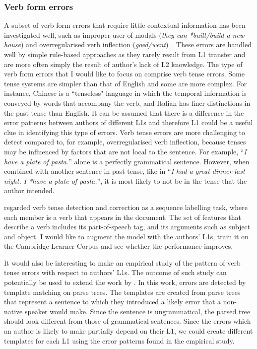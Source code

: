 \documentclass[11pt]{article}
\begin{document}
\subsubsection{Verb form errors}
\label{subsub:verb}
A subset of verb form errors that require little contextual information has been 
investigated well, such as improper user of modals (\emph{they can *built/build 
a new house}) and overregularised verb inflection 
({\em *goed/went})~\citep{chodorow2000unsupervised, leacock2003automated}. These 
errors are handled well by simple rule-based approaches as they rarely 
result from L1 transfer and are more often simply the result of author's lack of L2 knowledge. The type of verb 
form errors that I would like to focus on comprise verb tense errors. Some tense 
systems are simpler than that of English and some are more complex. For 
instance, Chinese is a ``tenseless" language in which the temporal information is 
conveyed by words that accompany the verb, and Italian has finer distinctions in 
the past tense than English. It can be assumed that there is a difference in the 
error patterns between authors of different L1s and therefore L1 could be a useful 
clue in identifying this type of errors. Verb tense errors are more challenging 
to detect compared to, for example, overregularised verb inflection, because 
tenses may be influenced by factors that are not local to the sentence. For 
example, ``{\em I have a plate of pasta.}'' alone is a perfectly grammatical sentence. 
However, when combined with another sentence in past tense, like in ``{\em I had a 
great dinner last night. I *have a plate of pasta.}'', it is most likely to not be in 
the tense that the author intended.

\cite{tajiri2012tense} regarded verb tense detection and correction as a 
sequence labelling task, where each member is a verb that appears in the 
document. The set of features that describe a verb includes its 
part-of-speech tag, and its arguments such as subject and object. I would like to 
augment the model with the authors' L1s, train it on the Cambridge Learner Corpus 
and see whether the performance improves.

It would also be interesting to make an empirical study of the pattern of verb 
tense errors with respect to authors' L1s. The outcome of such study can 
potentially be used to extend the work by \cite{lee2008correcting}. In this 
work, errors are detected by template matching on parse trees. The templates are 
created from parse trees that represent a sentence to which they introduced a 
likely error that a non-native speaker would make. Since the sentence is 
ungrammatical, the parsed tree should look different from those of grammatical 
sentences. Since the errors which an author is likely to make partially depend 
on their L1, we could create different templates for each L1 using the error 
patterns found in the empirical study.
\end{document}
